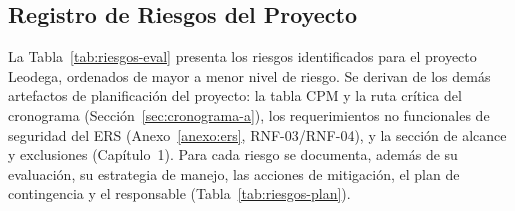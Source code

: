 \subsection{Registro de Riesgos del Proyecto}

La Tabla~\ref{tab:riesgos-eval} presenta los riesgos identificados para el proyecto Leodega, ordenados de mayor a menor nivel de riesgo. Se derivan de los demás artefactos de planificación del proyecto: la tabla CPM y la ruta crítica del cronograma (Sección~\ref{sec:cronograma-a}), los requerimientos no funcionales de seguridad del ERS (Anexo~\ref{anexo:ers}, RNF-03/RNF-04), y la sección de alcance y exclusiones (Capítulo~1). Para cada riesgo se documenta, además de su evaluación, su estrategia de manejo, las acciones de mitigación, el plan de contingencia y el responsable (Tabla~\ref{tab:riesgos-plan}).

